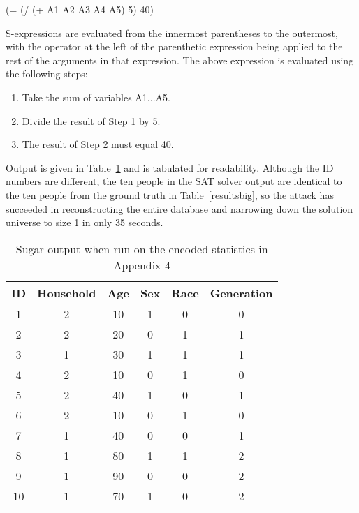 \documentclass[5p,times,11pt]{elsarticle}
\begin{document}
(= (/ (+ A1 A2 A3 A4 A5) 5) 40)

S-expressions are evaluated from the innermost parentheses to the outermost, with the operator at the left of the parenthetic expression being applied to the rest of the arguments in that expression. The above expression is evaluated using the following steps:
\begin{enumerate}
    \item Take the sum of variables A1...A5.
    \item Divide the result of Step 1 by 5.
    \item The result of Step 2 must equal 40.
\end{enumerate}

Output is given in Table~\ref{sugarbig} and is tabulated for readability. Although the ID numbers are different, the ten people in the SAT solver output are identical to the ten people from the ground truth in Table~\ref{resultsbig}, so the attack has succeeded in reconstructing the entire database and narrowing down the solution universe to size 1 in only 35 seconds.

\begin{table}
\begin{tabular}{c|c|c|c|c|c}
ID & Household & Age & Sex & Race & Generation \\
\hline
1 & 2 & 10 & 1 & 0 & 0  \\
2 & 2 & 20 & 0 & 1 & 1  \\
3 & 1 & 30 & 1 & 1 & 1  \\
4 & 2 & 10 & 0 & 1 & 0  \\
5 & 2 & 40 & 1 & 0 & 1  \\
6 & 2 & 10 & 0 & 1 & 0  \\
7 & 1 & 40 & 0 & 0 & 1  \\
8 & 1 & 80 & 1 & 1 & 2  \\
9 & 1 & 90 & 0 & 0 & 2 \\
10 & 1 & 70 & 1 & 0 & 2 \\
\hline
\end{tabular}
\caption{Sugar output when run on the encoded statistics in Appendix 4}\label{sugarbig}
\end{table}

\pagebreak
\end{document}
